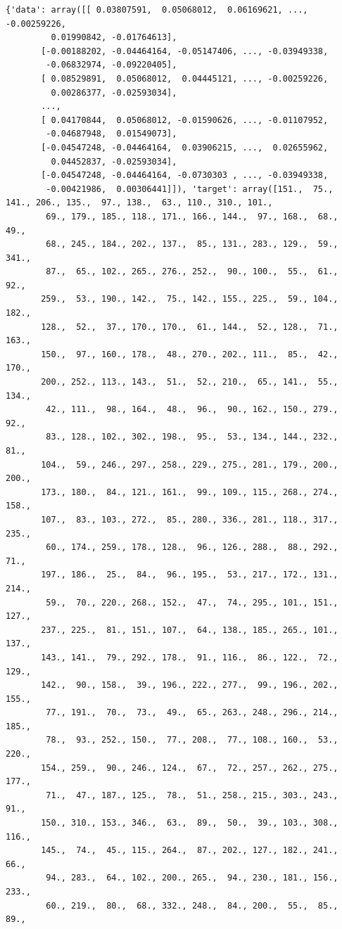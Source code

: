 \documentclass[11pt]{article}
\begin{document}
\begin{verbatim}
{'data': array([[ 0.03807591,  0.05068012,  0.06169621, ..., -0.00259226,
         0.01990842, -0.01764613],
       [-0.00188202, -0.04464164, -0.05147406, ..., -0.03949338,
        -0.06832974, -0.09220405],
       [ 0.08529891,  0.05068012,  0.04445121, ..., -0.00259226,
         0.00286377, -0.02593034],
       ...,
       [ 0.04170844,  0.05068012, -0.01590626, ..., -0.01107952,
        -0.04687948,  0.01549073],
       [-0.04547248, -0.04464164,  0.03906215, ...,  0.02655962,
         0.04452837, -0.02593034],
       [-0.04547248, -0.04464164, -0.0730303 , ..., -0.03949338,
        -0.00421986,  0.00306441]]), 'target': array([151.,  75., 141., 206., 135.,  97., 138.,  63., 110., 310., 101.,
        69., 179., 185., 118., 171., 166., 144.,  97., 168.,  68.,  49.,
        68., 245., 184., 202., 137.,  85., 131., 283., 129.,  59., 341.,
        87.,  65., 102., 265., 276., 252.,  90., 100.,  55.,  61.,  92.,
       259.,  53., 190., 142.,  75., 142., 155., 225.,  59., 104., 182.,
       128.,  52.,  37., 170., 170.,  61., 144.,  52., 128.,  71., 163.,
       150.,  97., 160., 178.,  48., 270., 202., 111.,  85.,  42., 170.,
       200., 252., 113., 143.,  51.,  52., 210.,  65., 141.,  55., 134.,
        42., 111.,  98., 164.,  48.,  96.,  90., 162., 150., 279.,  92.,
        83., 128., 102., 302., 198.,  95.,  53., 134., 144., 232.,  81.,
       104.,  59., 246., 297., 258., 229., 275., 281., 179., 200., 200.,
       173., 180.,  84., 121., 161.,  99., 109., 115., 268., 274., 158.,
       107.,  83., 103., 272.,  85., 280., 336., 281., 118., 317., 235.,
        60., 174., 259., 178., 128.,  96., 126., 288.,  88., 292.,  71.,
       197., 186.,  25.,  84.,  96., 195.,  53., 217., 172., 131., 214.,
        59.,  70., 220., 268., 152.,  47.,  74., 295., 101., 151., 127.,
       237., 225.,  81., 151., 107.,  64., 138., 185., 265., 101., 137.,
       143., 141.,  79., 292., 178.,  91., 116.,  86., 122.,  72., 129.,
       142.,  90., 158.,  39., 196., 222., 277.,  99., 196., 202., 155.,
        77., 191.,  70.,  73.,  49.,  65., 263., 248., 296., 214., 185.,
        78.,  93., 252., 150.,  77., 208.,  77., 108., 160.,  53., 220.,
       154., 259.,  90., 246., 124.,  67.,  72., 257., 262., 275., 177.,
        71.,  47., 187., 125.,  78.,  51., 258., 215., 303., 243.,  91.,
       150., 310., 153., 346.,  63.,  89.,  50.,  39., 103., 308., 116.,
       145.,  74.,  45., 115., 264.,  87., 202., 127., 182., 241.,  66.,
        94., 283.,  64., 102., 200., 265.,  94., 230., 181., 156., 233.,
        60., 219.,  80.,  68., 332., 248.,  84., 200.,  55.,  85.,  89.,

\end{verbatim}
\end{document}
